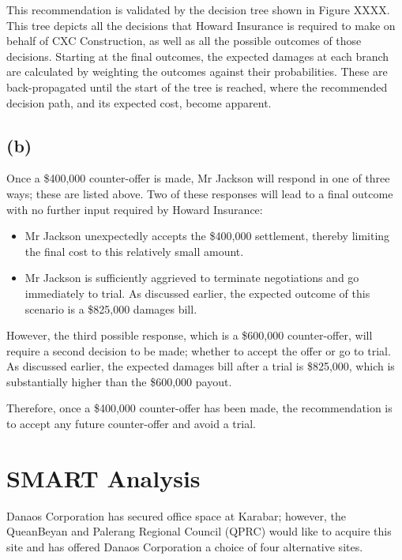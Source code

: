 \documentclass[11pt, a4paper]{article}
\begin{document}
    This recommendation is validated by the decision tree shown in Figure XXXX. This tree depicts all the decisions that Howard Insurance is required to make on behalf of CXC Construction, as well as all the possible outcomes of those decisions. Starting at the final outcomes, the expected damages at each branch are calculated by weighting the outcomes against their probabilities. These are back-propagated until the start of the tree is reached, where the recommended decision path, and its expected cost, become apparent.

    \subsection*{(b)}

    Once a \$400,000 counter-offer is made, Mr Jackson will respond in one of three ways; these are listed above. Two of these responses will lead to a final outcome with no further input required by Howard Insurance:

    \begin{itemize}
        \item Mr Jackson unexpectedly accepts the \$400,000 settlement, thereby limiting the final cost to this relatively small amount.
        \item Mr Jackson is sufficiently aggrieved to terminate negotiations and go immediately to trial. As discussed earlier, the expected outcome of this scenario is a \$825,000 damages bill.
    \end{itemize}

    However, the third possible response, which is a \$600,000 counter-offer, will require a second decision to be made; whether to accept the offer or go to trial. As discussed earlier, the expected damages bill after a trial is \$825,000, which is substantially higher than the \$600,000 payout. 

    Therefore, once a \$400,000 counter-offer has been made, the recommendation is to accept any future counter-offer and avoid a trial.

    \section{SMART Analysis}
    
    Danaos Corporation has secured office space at Karabar; however, the QueanBeyan and Palerang Regional Council (QPRC) would like to acquire this site and has offered Danaos Corporation a choice of four alternative sites.
\end{document}
